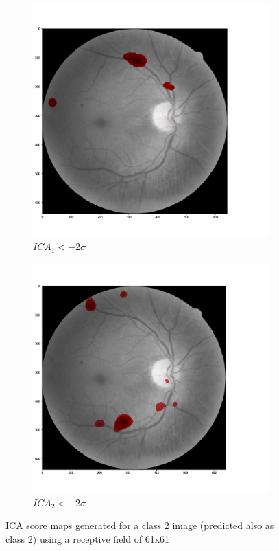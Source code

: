 \documentclass[preprint]{elsarticle}
\theoremstyle{definition} %
\theoremstyle{remark}
\begin{document}
\begin{figure}[h!]
\begin{subfigure}[b]{0.32\textwidth}
		\includegraphics[width=\textwidth]{figures/img_t2_p2/rf61/ica1.png}
		\caption{$ICA_1 < - 2 \sigma$}	
	\end{subfigure}
	\begin{subfigure}[b]{0.32\textwidth}
		\centering
		\includegraphics[width=\textwidth]{figures/img_t2_p2/rf61/ica2.png}
		\caption{$ICA_2 < - 2 \sigma$}	
	\end{subfigure}
	\hfill 
	\caption{ICA score maps generated for a class 2 image (predicted also as class 2) using a receptive field of 61x61}  
	\label{fig:ica_components_class2} 
\end{figure}
\end{document}

